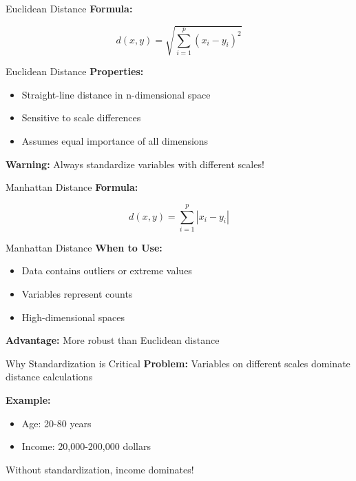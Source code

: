 \documentclass[aspectratio=169,ignorenonframetext]{beamer}
\begin{document}
\begin{frame}{Euclidean Distance}
\textbf{Formula:}

\[d(x,y) = \sqrt{\sum_{i = 1}^{p}\left( x_{i} - y_{i} \right)^{2}}\]
\end{frame}

\begin{frame}{Euclidean Distance}
\textbf{Properties:}

\begin{itemize}
\item
  Straight-line distance in n-dimensional space
\item
  Sensitive to scale differences
\item
  Assumes equal importance of all dimensions
\end{itemize}

\textbf{Warning:} Always standardize variables with different scales!
\end{frame}

\begin{frame}{Manhattan Distance}
\textbf{Formula:}

\[d(x,y) = \sum_{i = 1}^{p}|x_{i} - y_{i}|\]
\end{frame}

\begin{frame}{Manhattan Distance}
\textbf{When to Use:}

\begin{itemize}
\item
  Data contains outliers or extreme values
\item
  Variables represent counts
\item
  High-dimensional spaces
\end{itemize}

\textbf{Advantage:} More robust than Euclidean distance
\end{frame}

\begin{frame}{Why Standardization is Critical}
\textbf{Problem:} Variables on different scales dominate distance
calculations

\textbf{Example:}

\begin{itemize}
\item
  Age: 20-80 years
\item
  Income: 20,000-200,000 dollars
\end{itemize}

Without standardization, income dominates!
\end{frame}
\end{document}
